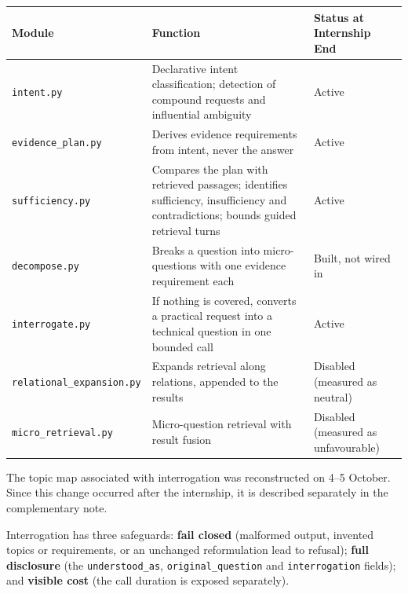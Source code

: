 \documentclass[a4paper,12pt,openany]{report}
\begin{document}
\begin{table}[htbp]
\centering
\small
\begin{tabular}{p{4.3cm}p{7.7cm}p{2.5cm}}
\toprule
\textbf{Module} & \textbf{Function} & \textbf{Status at Internship End} \\
\midrule
\texttt{intent.py} & Declarative intent classification; detection of compound requests and
influential ambiguity & Active \\
\texttt{evidence\_plan.py} & Derives evidence requirements from intent, never the answer & Active \\
\texttt{sufficiency.py} & Compares the plan with retrieved passages; identifies sufficiency,
insufficiency and contradictions; bounds guided retrieval turns & Active \\
\texttt{decompose.py} & Breaks a question into micro-questions with one evidence requirement each &
Built, not wired in \\
\texttt{interrogate.py} & If nothing is covered, converts a practical request into a technical
question in one bounded call & Active \\
\texttt{relational\_expansion.py} & Expands retrieval along relations, appended to the results &
Disabled (measured as neutral) \\
\texttt{micro\_retrieval.py} & Micro-question retrieval with result fusion & Disabled (measured as
unfavourable) \\
\bottomrule
\end{tabular}
\end{table}

The topic map associated with interrogation was reconstructed on 4--5 October. Since this change
occurred after the internship, it is described separately in the complementary note.

Interrogation has three safeguards: \textbf{fail closed} (malformed output, invented topics or
requirements, or an unchanged reformulation lead to refusal); \textbf{full disclosure} (the
\texttt{understood\_as}, \texttt{original\_question} and \texttt{interrogation} fields); and
\textbf{visible cost} (the call duration is exposed separately).
\end{document}
